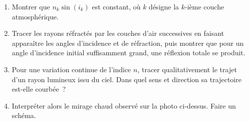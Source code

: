 \documentclass[../../main/main.tex]{subfiles}
\begin{document}
{\begin{enumerate}
\begin{minipage}{0.47\linewidth}
\begin{center}
				      \label{fig:mirage_plain}
			      \end{center}
		      \end{minipage}
		      \begin{enumerate}
			      \item Montrer que $n_k\sin(i_k)$ est constant, où $k$ désigne la
			            $k$-ième couche atmosphérique.
			      \item Tracer les rayons réfractés par les couches d'air successives en
			            faisant apparaître les angles d'incidence et de réfraction, puis
			            montrer que pour un angle d'incidence initial suffisamment grand,
			            une réflexion totale se produit.
			      \item Pour une variation continue de l'indice $n$, tracer
			            qualitativement le trajet d'un rayon lumineux issu du ciel. Dans
			            quel sens et direction sa trajectoire est-elle courbée~?
			      \item Interpréter alors le mirage chaud observé sur la photo ci-dessus.
			            Faire un schéma.
		      \end{enumerate}


\end{enumerate}}
\end{document}
